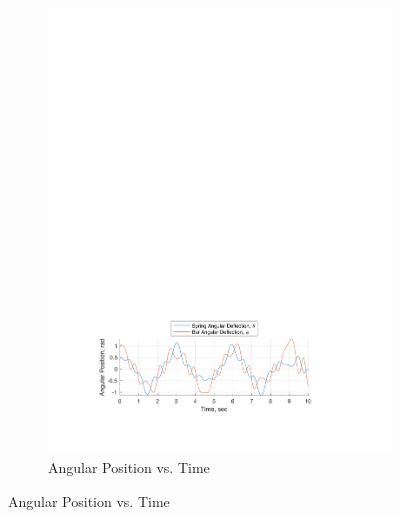 \documentclass[12pt]{report}
\begin{document}
\begin{flushleft}
\begin{figure}[!ht] \ContinuedFloat
\begin{subfigure}[t]{\textwidth}
  \includegraphics[center]{angles_6-3}
  \caption{Angular Position vs. Time}
  \label{fig:angles:6-3}
\end{subfigure}
\end{figure}
\newpage


\end{flushleft}
\end{document}

